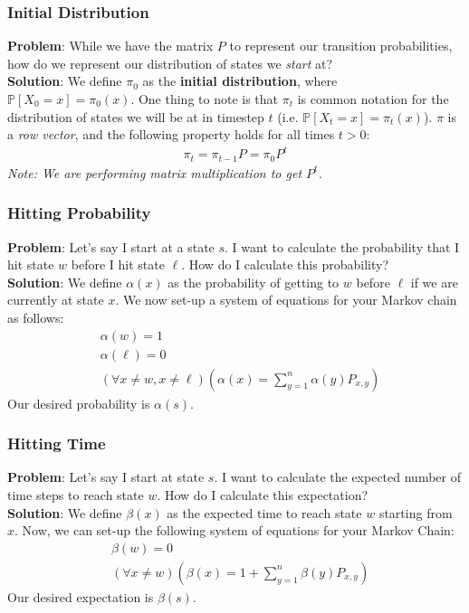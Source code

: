 \documentclass{beamer}
\begin{document}
\begin{frame}
    \frametitle{Initial Distribution}
    {\bf Problem}: While we have the matrix $P$ to represent our transition probabilities, how do we represent our distribution of states we {\it start} at?\\
    {\bf Solution}: We define $\pi_0$ as the {\bf initial distribution}, where $\mathbb{P}[X_0=x]=\pi_0(x)$. One thing to note is that $\pi_t$ is common notation for the distribution of states we will be at in timestep $t$ (i.e. $\mathbb{P}[X_t=x]=\pi_t(x)$). $\pi$ is a {\it row vector}, and the following property holds for all times $t>0$:
    \begin{align*}
        \pi_t=\pi_{t-1}P=\pi_0 P^t
    \end{align*}
    {\it Note: We are performing matrix multiplication to get $P^t$.}
\end{frame}

\begin{frame}
    \frametitle{Hitting Probability}
    {\bf Problem}: Let's say I start at a state $s$. I want to calculate the probability that I hit state $w$ before I hit state $\ell$. How do I calculate this probability?\\
    {\bf Solution}: We define $\alpha(x)$ as the probability of getting to $w$ before $\ell$ if we are currently at state $x$. We now set-up a system of equations for your Markov chain as follows:
    \begin{align*}
        &\alpha(w)=1\\
        &\alpha(\ell)=0\\
        &(\forall x\neq w,x\neq\ell)\left(\alpha(x)=\sum_{y=1}^n\alpha(y)P_{x,y}\right)
    \end{align*}
    Our desired probability is $\alpha(s)$.
\end{frame}

\begin{frame}
    \frametitle{Hitting Time}
    {\bf Problem}: Let's say I start at state $s$. I want to calculate the expected number of time steps to reach state $w$. How do I calculate this expectation?\\
    {\bf Solution}: We define $\beta(x)$ as the expected time to reach state $w$ starting from $x$. Now, we can set-up the following system of equations for your Markov Chain:
    \begin{align*}
        &\beta(w)=0\\
        &(\forall x\neq w)\left(\beta(x)=1+\sum_{y=1}^n\beta(y)P_{x,y}\right)
    \end{align*}
    Our desired expectation is $\beta(s)$.
\end{frame}
\end{document}
